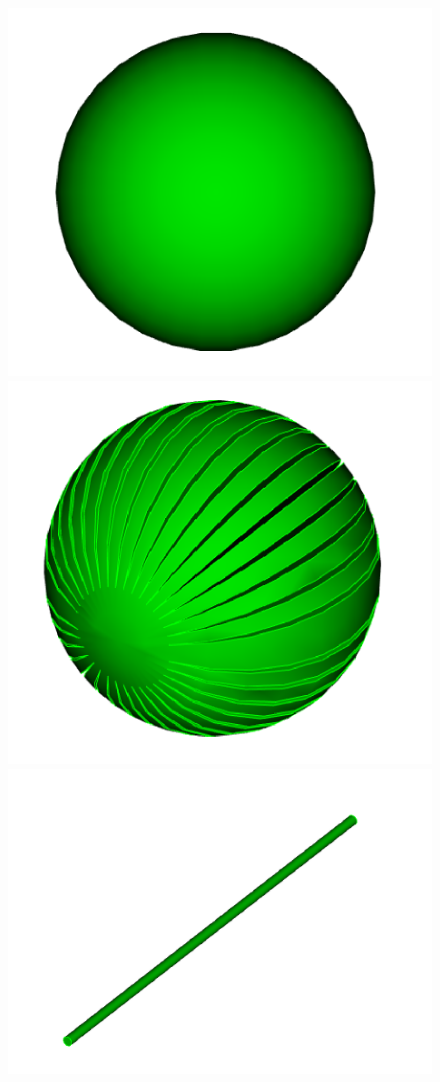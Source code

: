 \documentclass[10pt, a4paper]{article}
\begin{document}
\begin{figure}
\begin{center}
    \includegraphics[scale=0.1]{sphere.png}
    \includegraphics[scale=0.1]{ds.png}
    \includegraphics[scale=0.1]{larcyl.png}

\end{center}
\end{figure}
\end{document}
